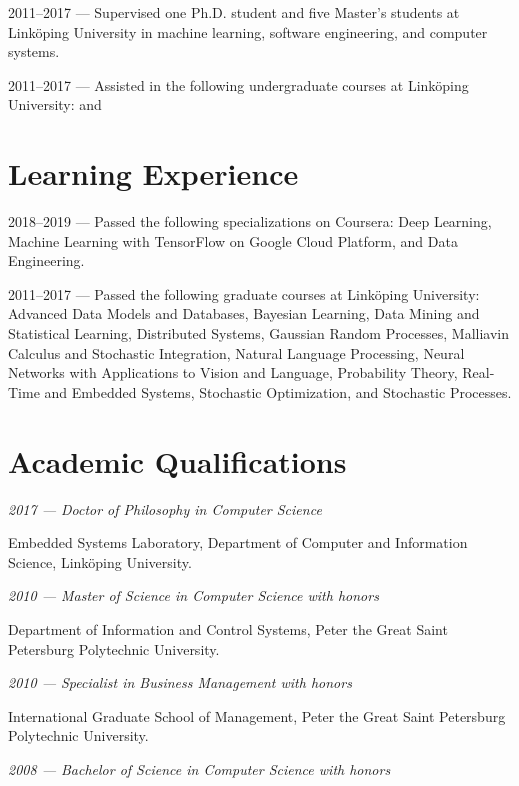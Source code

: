 \documentclass[journal]{IEEEtran}
\begin{document}
2011--2017 --- Supervised one Ph.D. student and five Master's students at
Linköping University in machine learning, software engineering, and computer
systems.

2011--2017 --- Assisted in the following undergraduate courses at Linköping
University:  
 and

\section{Learning Experience}
2018--2019 --- Passed the following specializations on Coursera: Deep Learning,
Machine Learning with TensorFlow on Google Cloud Platform, and Data Engineering.

2011--2017 --- Passed the following graduate courses at Linköping University:
Advanced Data Models and Databases, Bayesian Learning, Data Mining and
Statistical Learning, Distributed Systems, Gaussian Random Processes, Malliavin
Calculus and Stochastic Integration, Natural Language Processing, Neural
Networks with Applications to Vision and Language, Probability Theory, Real-Time
and Embedded Systems, Stochastic Optimization, and Stochastic Processes.

\section{Academic Qualifications}
\emph{2017 --- Doctor of Philosophy in Computer Science}

Embedded Systems Laboratory, Department of Computer and Information Science,
Linköping University.

\emph{2010 --- Master of Science in Computer Science with honors}

Department of Information and Control Systems, Peter the Great Saint Petersburg
Polytechnic University.

\emph{2010 --- Specialist in Business Management with honors}

International Graduate School of Management, Peter the Great Saint Petersburg
Polytechnic University.

\emph{2008 --- Bachelor of Science in Computer Science with honors}
\end{document}
